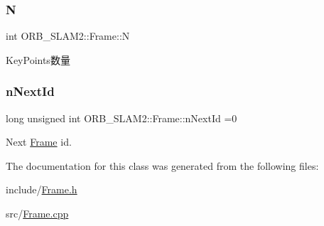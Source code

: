 \mbox{\label{class_o_r_b___s_l_a_m2_1_1_frame_a0035828f1744f1bdd4ae8681e7cbbd32}} 
\subsubsection{\texorpdfstring{N}{N}}
{\footnotesize\ttfamily int O\+R\+B\+\_\+\+S\+L\+A\+M2\+::\+Frame\+::N}



Key\+Points数量 

\mbox{\label{class_o_r_b___s_l_a_m2_1_1_frame_a1ea8a00151931d155747283850467733}} 
\subsubsection{\texorpdfstring{n\+Next\+Id}{nNextId}}
{\footnotesize\ttfamily long unsigned int O\+R\+B\+\_\+\+S\+L\+A\+M2\+::\+Frame\+::n\+Next\+Id =0\hspace{0.3cm}{\ttfamily [static]}}



Next \mbox{\hyperlink{class_o_r_b___s_l_a_m2_1_1_frame}{Frame}} id. 



The documentation for this class was generated from the following files\+:\begin{DoxyCompactItemize}
\item 
include/\mbox{\hyperlink{_frame_8h}{Frame.\+h}}\item 
src/\mbox{\hyperlink{_frame_8cpp}{Frame.\+cpp}}\end{DoxyCompactItemize}
